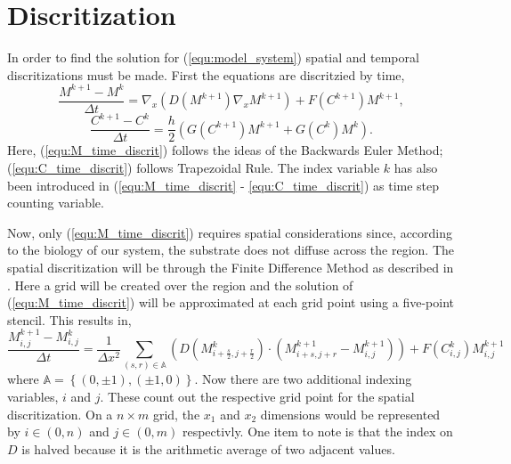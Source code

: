 \section{Discritization}

In order to find the solution for (\ref{equ:model_system}) spatial and temporal discritizations must be made.
First the equations are discritzied by time, 
\begin{equation} \label{equ:M_time_discrit}
  \frac{M^{k+1} - M^{k}}{\Delta t} = \nabla_x (D(M^{k+1}) \nabla_x M^{k+1}) + F(C^{k+1}) M^{k+1},
\end{equation}
\begin{equation} \label{equ:C_time_discrit}
  \frac{C^{k+1} - C^{k}}{\Delta t} = \frac{h}{2} ( G(C^{k+1}) M^{k+1} + G(C^{k}) M^{k} ).
\end{equation}
Here, (\ref{equ:M_time_discrit}) follows the ideas of the Backwards Euler Method; (\ref{equ:C_time_discrit}) follows Trapezoidal Rule. 
The index variable $k$ has also been introduced in (\ref{equ:M_time_discrit} - \ref{equ:C_time_discrit}) as time step counting variable.

Now, only (\ref{equ:M_time_discrit}) requires spatial considerations since, according to the biology of our system, the substrate does not diffuse across the region.
The spatial discritization will be through the Finite Difference Method as described in \cite{saad2003iterativeMethod}.
Here a grid will be created over the region and the solution of (\ref{equ:M_time_discrit}) will be approximated at each grid point using a five-point stencil. 
This results in, 
\begin{equation} \label{equ:M_space_discrit}
  \frac{M^{k+1}_{i,j} - M^{k}_{i,j}}{\Delta t} = 
    \frac{1}{\Delta x^2} \sum_{(s,r) \in \mathbb{A}} \left( D(M^{k}_{i+\frac{s}{2}, j+\frac{r}{2}}) \cdot
    ( M^{k+1}_{i+s, j+r} - M^{k+1}_{i,j}) \right) + F(C^{k}_{i,j}) M^{k+1}_{i,j}
\end{equation}
where $\mathbb{A} = \left\{ (0, \pm1), (\pm1, 0) \right\}$.
Now there are two additional indexing variables, $i$ and $j$.
These count out the respective grid point for the spatial discritization.
On a $n \times m$ grid, the $x_1$ and $x_2$ dimensions would be represented by $i \in (0, n)$ and $j \in (0,m)$ respectivly.
One item to note is that the index on $D$ is halved because it is the arithmetic average of two adjacent values.

